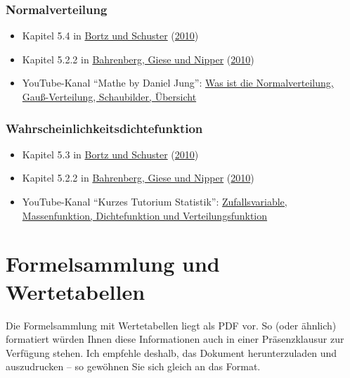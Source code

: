 \documentclass[
  11pt,
  ngerman,
  a4paper,
]{report}
\providecommand{\tightlist}{%
  \setlength{\itemsep}{0pt}\setlength{\parskip}{0pt}}
\begin{document}
\hypertarget{normalverteilung-1}{%
\subsection{Normalverteilung}\label{normalverteilung-1}}

\begin{itemize}
\tightlist
\item
  Kapitel 5.4 in \protect\hyperlink{ref-bortz}{Bortz und Schuster} (\protect\hyperlink{ref-bortz}{2010})
\item
  Kapitel 5.2.2 in \protect\hyperlink{ref-bahrenberg}{Bahrenberg, Giese und Nipper} (\protect\hyperlink{ref-bahrenberg}{2010})
\item
  YouTube-Kanal \enquote{Mathe by Daniel Jung}: \href{https://www.youtube.com/watch?v=_f1vgWUiavY}{Was ist die Normalverteilung, Gauß-Verteilung, Schaubilder, Übersicht}
\end{itemize}

\hypertarget{wahrscheinlichkeitsdichtefunktion}{%
\subsection{Wahrscheinlichkeitsdichtefunktion}\label{wahrscheinlichkeitsdichtefunktion}}

\begin{itemize}
\tightlist
\item
  Kapitel 5.3 in \protect\hyperlink{ref-bortz}{Bortz und Schuster} (\protect\hyperlink{ref-bortz}{2010})
\item
  Kapitel 5.2.2 in \protect\hyperlink{ref-bahrenberg}{Bahrenberg, Giese und Nipper} (\protect\hyperlink{ref-bahrenberg}{2010})
\item
  YouTube-Kanal \enquote{Kurzes Tutorium Statistik}: \href{https://www.youtube.com/watch?v=DoHTsDrzAQk}{Zufallsvariable, Massenfunktion, Dichtefunktion und Verteilungsfunktion}
\end{itemize}

\hypertarget{formelsammlung-und-wertetabellen}{%
\chapter*{Formelsammlung und Wertetabellen}\label{formelsammlung-und-wertetabellen}}

Die Formelsammlung mit Wertetabellen liegt als PDF vor. So (oder ähnlich) formatiert würden Ihnen diese Informationen auch in einer Präsenzklausur zur Verfügung stehen. Ich empfehle deshalb, das Dokument herunterzuladen und auszudrucken -- so gewöhnen Sie sich gleich an das Format.
\end{document}
